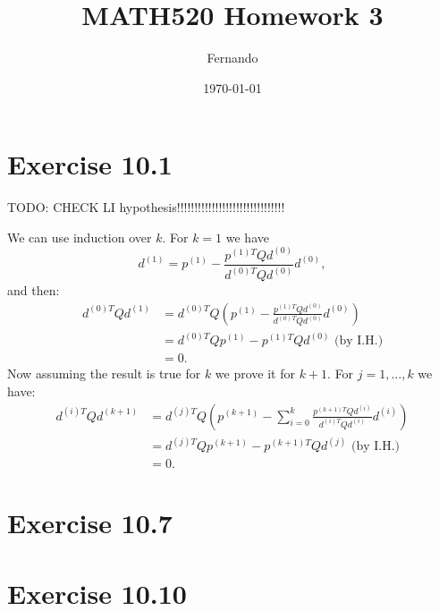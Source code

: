 \documentclass{article}
\begin{document}
\title{MATH520 Homework 3}
\author{Fernando}
\date{\today}
\maketitle

\section*{Exercise 10.1}
TODO: CHECK LI hypothesis!!!!!!!!!!!!!!!!!!!!!!!!!!!!!!!

We can use induction over $k$. For $k=1$ we have
\[
	d^{(1)}=p^{(1)}-\frac{p^{(1)T}Qd^{(0)}}{d^{(0)T}Qd^{(0)}}d^{(0)},
\]
and then:
\begin{align*}
	d^{(0)T}Qd^{(1)}&=
	d^{(0)T}Q\left(p^{(1)}-\frac{p^{(1)T}Qd^{(0)}}{d^{(0)T}Qd^{(0)}}d^{(0)}\right)\\
	&=
	d^{(0)T}Qp^{(1)}-p^{(1)T}Qd^{(0)} \text{ (by I.H.)}\\
	&=0.
\end{align*}
Now assuming the result is true for $k$ we prove it for $k+1$. For
$j=1,\dots,k$ we have:
\begin{align*}
	d^{(i)T}Qd^{(k+1)}&=
	d^{(j)T}Q\left(p^{(k+1)}-\sum_{i=0}^k\frac{p^{(k+1)T}Qd^{(i)}}{d^{(i)T}Qd^{(i)}}d^{(i)}\right)\\
	&=
	d^{(j)T}Qp^{(k+1)}-p^{(k+1)T}Qd^{(j)} \text{ (by I.H.)}\\
	&=0.
\end{align*}
\section*{Exercise 10.7}
\section*{Exercise 10.10}
\end{document}
